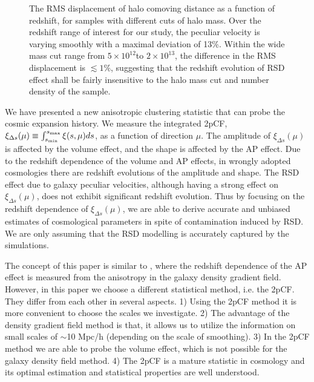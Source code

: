\documentclass[useAMS,usenatbib]{mn2e}
\newcommand{\hMsun}{{\ifmmode{h^{-1}{\rm
        {M_{\odot}}}}\else{$h^{-1}{\rm{M_{\odot}}}$~}\fi}}
\begin{document}
\begin{figure*}
   \caption{\label{fig_deltar}
   The RMS displacement of halo comoving distance as a function of redshift, for samples with different cuts of halo mass.
   Over the redshift range of interest for our study, the peculiar velocity is varying smoothly with a maximal deviation of 13\%.
   Within the wide mass cut range from $5\times 10^{12}$\hMsun to $2\times 10^{13}$\hMsun, 
   the difference in the RMS displacement is $\lesssim1\%$,
   suggesting that the redshift evolution of RSD effect shall be fairly insensitive to the halo mass cut and number density of the sample.
   }
\end{figure*}

We have presented a new anisotropic clustering statistic that can probe the cosmic expansion history.
We measure the integrated 2pCF, $\xi_{\Delta s}(\mu)\equiv\int_{s_{\rm min}}^{s_{\rm max}}\xi(s,\mu)ds$, as a function of direction $\mu$.
The amplitude of $\xi_{\Delta s}(\mu)$ is affected by the volume effect,
and the shape is affected by the AP effect.
Due to the redshift dependence of the volume and AP effects, 
in wrongly adopted cosmologies there are redshift evolutions of the amplitude and shape.
The RSD effect due to galaxy peculiar velocities, although having a strong effect on $\xi_{\Delta s}(\mu)$,
does not exhibit significant redshift evolution.
Thus by focusing on the redshift dependence of $\xi_{\Delta s}(\mu)$,
we are able to derive accurate and unbiased estimates of cosmological parameters in spite of contamination induced by RSD.
We are only assuming that the RSD modelling is accurately captured by the simulations.

The concept of this paper is similar to \cite{Li2014}, 
where the redshift dependence of the AP effect is measured from the anisotropy in the galaxy density gradient field.
However, in this paper we choose a different statistical method, i.e. the 2pCF.
They differ from each other in several aspects.
1) Using the 2pCF method it is more convenient to choose the scales we investigate.
2) The advantage of the density gradient field method is that, it allows us to utilize the information on small scales of $\sim$10 Mpc/h 
(depending on the scale of smoothing).
3) In the 2pCF method we are able to probe the volume effect, which is not possible for the galaxy density field method.
4) The 2pCF is a mature statistic in cosmology and its optimal estimation and statistical properties are well understood.
\end{document}

